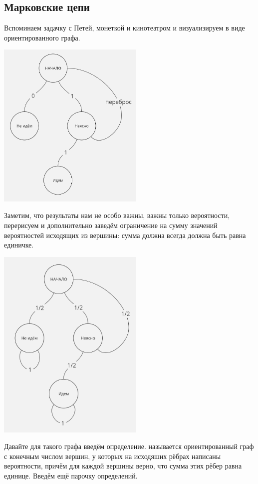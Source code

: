 \subsection{Марковские цепи}
Вспоминаем задачку с Петей, монеткой и кинотеатром и визуализируем в виде ориентированного графа.
\begin{center}
    \includegraphics[width = 7cm]{assets/5_1_1.jpg}
\end{center}
Заметим, что результаты нам не особо важны, важны только вероятности, перерисуем и дополнительно заведём ограничение на сумму значений вероятностей исходящих из вершины: сумма должна всегда должна быть равна единичке.
\begin{center}
    \includegraphics[width = 7cm]{assets/5_1_2.jpg}
\end{center}
Давайте для такого графа введём определение.
\newpage
{} называется ориентированный граф с конечным числом вершин, у которых на исходяших рёбрах написаны вероятности, причём для каждой вершины верно, что сумма этих рёбер равна единице. Введём ещё парочку определений.



